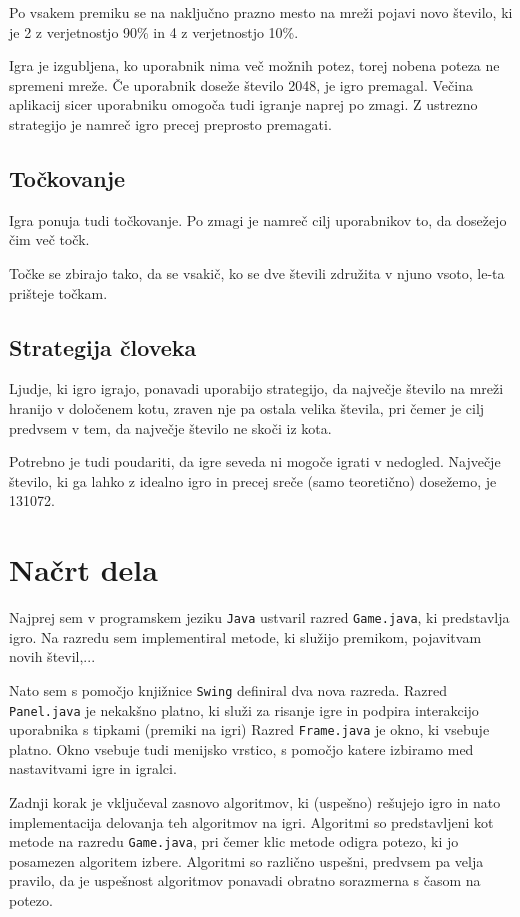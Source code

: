 \documentclass{article}
\begin{document}
Po vsakem premiku se na naključno prazno mesto na mreži pojavi novo število, ki je 2 z verjetnostjo 90\% in 4 z verjetnostjo 10\%.

Igra je izgubljena, ko uporabnik nima več možnih potez, torej nobena poteza ne spremeni mreže. Če uporabnik doseže število 2048, je igro premagal. Večina aplikacij sicer uporabniku omogoča tudi igranje naprej po zmagi. Z ustrezno strategijo je namreč igro precej preprosto premagati.

\subsection{Točkovanje}

Igra ponuja tudi točkovanje. Po zmagi je namreč cilj uporabnikov to, da dosežejo čim več točk.

Točke se zbirajo tako, da se vsakič, ko se dve števili združita v njuno vsoto, le-ta prišteje točkam.

\subsection{Strategija človeka}

Ljudje, ki igro igrajo, ponavadi uporabijo strategijo, da največje število na mreži hranijo v določenem kotu, zraven nje pa ostala velika števila, pri čemer je cilj predvsem v tem, da največje število ne skoči iz kota.

Potrebno je tudi poudariti, da igre seveda ni mogoče igrati v nedogled. Največje število, ki ga lahko z idealno igro in precej sreče (samo teoretično) dosežemo, je 131072.

\section{Načrt dela}

Najprej sem v programskem jeziku \texttt{Java} ustvaril razred \texttt{Game.java}, ki predstavlja igro. Na razredu sem implementiral metode, ki služijo premikom, pojavitvam novih števil,...

Nato sem s pomočjo knjižnice \texttt{Swing} definiral dva nova razreda. Razred \texttt{Panel.java} je nekakšno platno, ki služi za risanje igre in podpira interakcijo uporabnika s tipkami (premiki na igri) Razred \texttt{Frame.java} je okno, ki vsebuje platno. Okno vsebuje tudi menijsko vrstico, s pomočjo katere izbiramo med nastavitvami igre in igralci.

Zadnji korak je vključeval zasnovo algoritmov, ki (uspešno) rešujejo igro in nato implementacija delovanja teh algoritmov na igri. Algoritmi so predstavljeni kot metode na razredu \texttt{Game.java}, pri čemer klic metode odigra potezo, ki jo posamezen algoritem izbere. Algoritmi so različno uspešni, predvsem pa velja pravilo, da je uspešnost algoritmov ponavadi obratno sorazmerna s časom na potezo. 
\end{document}
